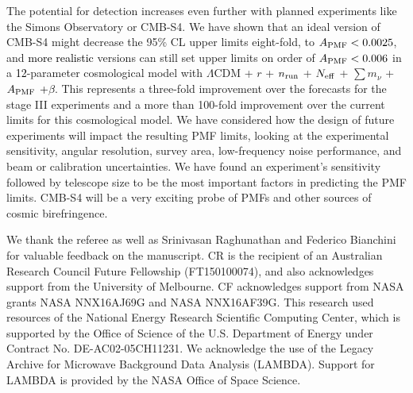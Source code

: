 \documentclass[apj]{emulateapj}
\newcommand{\apmf}{\ensuremath{A_{\rm PMF}}}
\newcommand{\lcdm}{\ensuremath{\Lambda}CDM}
\newcommand{\nrun}{\ensuremath{n_{\rm run}}}
\newcommand{\neff}{\ensuremath{N_{\rm eff}}}
\newcommand{\mnu}{\ensuremath{\sum m_\nu}}
\newcommand{\changed}[1]{\textcolor{Black}{#1}}
\begin{document}
The potential for detection increases even further with planned experiments like the Simons Observatory or CMB-S4. 
We have shown that an ideal version of CMB-S4 might decrease the 95\% CL upper limits eight-fold, to $\apmf < 0.0025$, and \changed{more realistic} versions can still set upper limits on order of $\apmf < 0.006$ in a \changed{12}-parameter cosmological model with  \lcdm{} +  $r$ + \nrun{} +  \neff{} + \mnu{} + \apmf{} \changed{+$\beta$}. 
This represents a three-fold improvement over the forecasts for the stage III experiments and a more than 100-fold improvement over the current limits for this cosmological model. 
We have considered how the design of future experiments will impact the resulting PMF limits, looking at the experimental sensitivity, angular resolution, survey area, low-frequency noise performance, and beam or calibration uncertainties. 
We have found an experiment's sensitivity followed by telescope size to be the most important factors in predicting the PMF limits. 
CMB-S4 will be a very exciting probe of PMFs and other sources of cosmic birefringence. 

\acknowledgments

We thank the referee as well as Srinivasan Raghunathan and Federico Bianchini for valuable feedback on the manuscript. 
CR is the recipient of an Australian Research Council Future Fellowship (FT150100074), and also acknowledges support from the University of Melbourne. 
CF acknowledges support from NASA grants NASA NNX16AJ69G and NASA NNX16AF39G. 
This research used resources of the National Energy Research Scientific Computing Center, which is supported by the Office of Science of the U.S. Department of Energy under Contract No. DE-AC02-05CH11231. 
We acknowledge the use of the Legacy Archive for Microwave Background Data Analysis (LAMBDA). Support for LAMBDA is provided by the NASA Office of Space Science.



\end{document}
